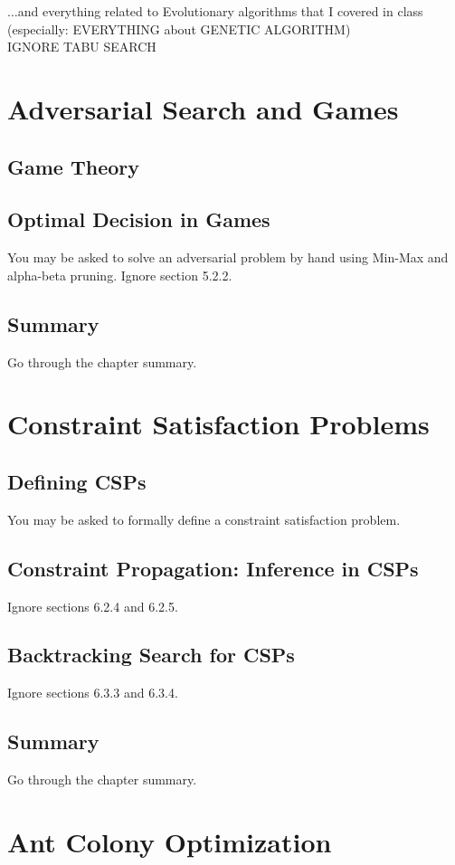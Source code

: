 \documentclass[exam={Midterm},color=true]{cs581exam}
\begin{document}
$\dots$and everything related to Evolutionary algorithms that I covered in class (especially: EVERYTHING about GENETIC ALGORITHM)\\
IGNORE TABU SEARCH


\section{Adversarial Search and Games}\label{sec:adversarial-search-and-games}
\subsection{Game Theory}\label{subsec:5.1}
\subsection{Optimal Decision in Games}\label{subsec:5.2}
You may be asked to solve an adversarial problem by hand using Min-Max
and alpha-beta pruning. Ignore section 5.2.2.
\subsection{Summary}\label{subsec:5-summary}
Go through the chapter summary.

\section{Constraint Satisfaction Problems}\label{sec:constraint-satisfaction-problems}
\subsection{Defining CSPs}\label{subsec:6.1}
You may be asked to formally define a constraint satisfaction problem.
\subsection{Constraint Propagation: Inference in CSPs}\label{subsec:6.2}
Ignore sections 6.2.4 and 6.2.5.
\subsection{Backtracking Search for CSPs}\label{subsec:6.3}
Ignore sections 6.3.3 and 6.3.4.
\subsection{Summary}\label{subsec:6-summary}
Go through the chapter summary.

\section{Ant Colony Optimization}\label{sec:ant-colony-optimization}
\end{document}

